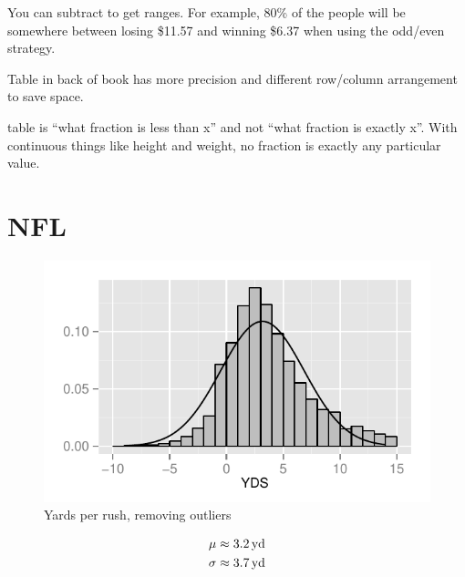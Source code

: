 \documentclass[landscape]{exam}
\begin{document}
  You can subtract to get ranges. For example, 80\% of the people will be
  somewhere between losing \$11.57 and winning \$6.37 when using the odd/even
  strategy.

  \begin{itemize*}
    \item Table in back of book has more precision and different row/column
      arrangement to save space.
    \item table is ``what fraction is less than x'' and not ``what fraction is
      exactly x''.  With continuous things like height and weight, no fraction is
      exactly any particular value.
  \end{itemize*}

  \section{NFL}

  \begin{figure}[H]
    \centering
    \includegraphics[scale = 0.9]{figures/nfl/yards_per_rush.pdf}
    \caption{Yards per rush, removing outliers}
  \end{figure}

  \begin{align*}
    \mu    & \approx \unit[3.2]{yd} \\
    \sigma & \approx \unit[3.7]{yd} \\
  \end{align*}
\end{document}

